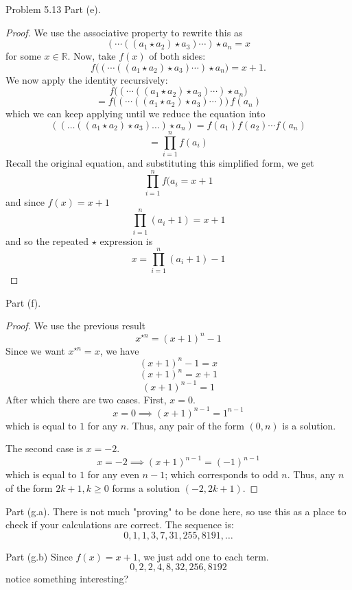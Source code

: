 \begin{sol}{Problem 5.13}
Part (e).
\begin{proof}
We use the associative property to rewrite this as 
\[
(\cdots ((a_1 \star a_2) \star a_3) \cdots ) \star a_n = x
\]
for some $x \in \mathbb{R}$. Now, take $f(x)$ of both sides:
\[
f\big((\cdots ((a_1 \star a_2) \star a_3) \cdots ) \star a_n\big) = x+1.
\]
We now apply the identity recursively:
\[
f\big((\cdots ((a_1 \star a_2) \star a_3) \cdots ) \star a_n\big)
\]
\[
= f\big((\cdots ((a_1 \star a_2) \star a_3) \cdots )\big)\,f(a_n)
\]
which we can keep applying until we reduce the equation into
\[
((\ldots ((a_1 \star a_2) \star a_3) \ldots ) \star a_n) = f(a_1)f(a_2)\cdots f(a_n)
\]
\[
= \prod_{i=1}^{n}{f(a_i)}
\]
Recall the original equation, and substituting this simplified form, we get
\[
\prod_{i=1}^{n}{f(a_i} = x + 1
\]
and since $f(x) = x + 1$
\[
\prod_{i=1}^{n}{(a_i+1)} = x + 1
\]
and so the repeated $\star$ expression is 
\[
x = \boxed{\prod_{i=1}^{n}{(a_i+1)}  - 1}
\]
\end{proof}

Part (f).
\begin{proof}
We use the previous result
\[
x^{\star n} = (x+1)^n - 1
\]
Since we want $x^{\star n} = x$, we have
\[
(x+1)^n - 1 = x
\]
\[
(x+1)^n = x + 1
\]
\[
(x+1)^{n-1} = 1
\]
After which there are two cases. First, $x= 0$. 
\[
x = 0 \implies (x+1)^{n-1} = 1^{n-1}
\]
which is equal to $1$ for any $n$. Thus, any pair of the form $(0, n)$ is a solution. 

The second case is $x = -2$. 
\[
x = -2 \implies (x+1)^{n-1} = (-1)^{n-1}
\]
which is equal to $1$ for any even $n-1$; which corresponds to odd $n$. Thus, any $n$ of the form $2k + 1, k \geq 0$ forms a solution $(-2, 2k+1)$.
\end{proof}

Part (g.a).
There is not much "proving" to be done here, so use this as a place to check if your calculations are correct. The sequence is:
\[
0, 1, 1, 3, 7, 31, 255, 8191, \ldots
\]

Part (g.b)
Since $f(x) = x + 1$, we just add one to each term.
\[
0, 2, 2, 4, 8, 32, 256, 8192
\]
notice something interesting?


\end{sol}
